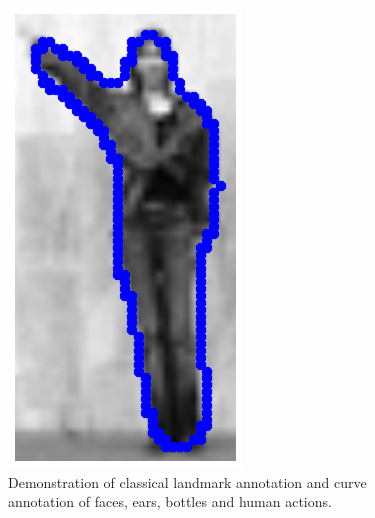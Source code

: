 \begin{figure}[ht]
    \includegraphics[width=\textwidth]{resources/Annotation_Correction/Fig_Intro/intro_3_5}
    \caption{Demonstration of classical landmark annotation and curve annotation of faces, ears, bottles and human actions.}
    \label{fig:intro}
\end{figure}

